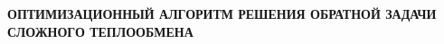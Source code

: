 \documentclass[12pt, a4paper]{article}
\begin{document}
    \begin{center}
        \textbf{ОПТИМИЗАЦИОННЫЙ АЛГОРИТМ РЕШЕНИЯ ОБРАТНОЙ ЗАДАЧИ СЛОЖНОГО ТЕПЛООБМЕНА}
    \end{center}
    
    
    
    
    
\end{document}
